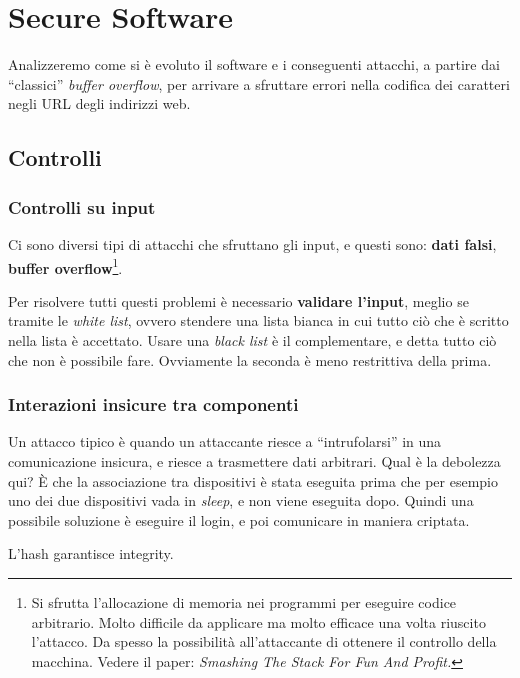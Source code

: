 \part{Secure Software}

Analizzeremo come si è evoluto il software e i conseguenti attacchi, a partire 
dai ``classici'' \textit{buffer overflow}, per arrivare a sfruttare errori nella 
codifica dei caratteri negli URL degli indirizzi web.

\chapter{Controlli}

\section{Controlli su input}

Ci sono diversi tipi di attacchi che sfruttano gli input, e questi sono: 
\textbf{dati falsi}, \textbf{buffer overflow}\footnote{Si sfrutta l'allocazione 
di memoria nei programmi per eseguire codice arbitrario. Molto difficile da 
applicare ma molto efficace una volta riuscito l'attacco. Da spesso la 
possibilità all'attaccante di ottenere il controllo della macchina. Vedere il 
paper: \textit{Smashing The Stack For Fun And Profit.}}.

Per risolvere tutti questi problemi è necessario \textbf{validare l'input}, 
meglio se tramite le \textit{white list}, ovvero stendere una lista bianca in 
cui tutto ciò che è scritto nella lista è accettato. Usare una \textit{black 
list} è il complementare, e detta tutto ciò che non è possibile fare. Ovviamente 
la seconda è meno restrittiva della prima.

\section{Interazioni insicure tra componenti}

Un attacco tipico è quando un attaccante riesce a ``intrufolarsi'' in una 
comunicazione insicura, e riesce a trasmettere dati arbitrari.
Qual è la debolezza qui? È che la associazione tra dispositivi è stata eseguita 
prima che per esempio uno dei due dispositivi vada in \textit{sleep}, e non 
viene eseguita dopo. Quindi una possibile soluzione è eseguire il login, e poi 
comunicare in maniera criptata.

L'hash garantisce integrity.

